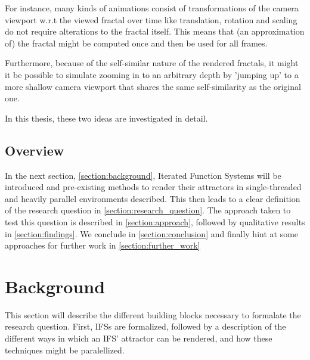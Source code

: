 \documentclass[11pt]{article}
\begin{document}
For instance, many kinds of animations consist of transformations of the camera viewport w.r.t the viewed fractal over time like translation, rotation and scaling do not require alterations to the fractal itself.
This means that (an approximation of) the fractal might be computed once and then be used for all frames.

Furthermore, because of the self-similar nature of the rendered fractals,
it might it be possible to simulate zooming in to an arbitrary depth by 'jumping up' to a more shallow camera viewport
that shares the same self-similarity as the original one.

In this thesis, these two ideas are investigated in detail.

\subsection{Overview}
\label{sec:orgc74ff05}

In the next section, \autoref{section:background}, Iterated Function Systems will be introduced and pre-existing methods to render their attractors in single-threaded and heavily parallel environments described.
This then leads to a clear definition of the research question in \autoref{section:research_question}.
The approach taken to test this question is described in \autoref{section:approach}, followed by qualitative results in \autoref{section:findings}.
We conclude in \autoref{section:conclusion} and finally hint at some approaches for further work in \autoref{section:further_work}


\section{Background}
\label{sec:org3ec764b}
\label{section:background}

This section will describe the different building blocks necessary to formalate the research question.
First, IFSs are formalized, followed by a description of the different ways in which an IFS' attractor can be rendered, 
and how these techniques might be paralellized.

\pagebreak
\end{document}
